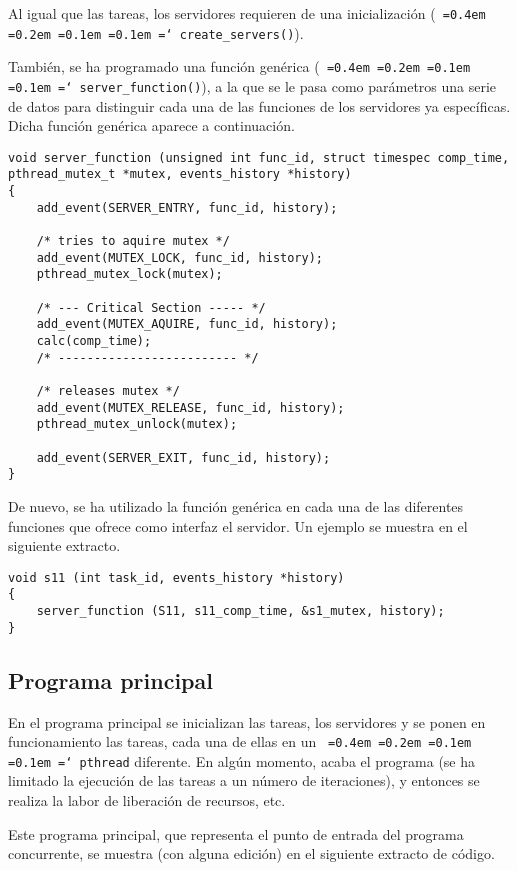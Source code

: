 \documentclass[11pt,spanish]{article}
\newcommand*\justify{%
  \fontdimen2\font=0.4em%
  \fontdimen3\font=0.2em%
  \fontdimen4\font=0.1em%
  \fontdimen7\font=0.1em%
  \hyphenchar\font=`\-%
}
\newcommand{\code}[1]{\texttt{\justify #1}}
\begin{document}
Al igual que las tareas, los servidores requieren de una inicialización (\code{create\_servers()}).

También, se ha programado una función genérica (\code{server\_function()}), a la
que se le pasa como parámetros una serie de datos para distinguir cada una de las
funciones de los servidores ya específicas. Dicha función genérica aparece a 
continuación.

\begin{lstlisting}[style=c]
void server_function (unsigned int func_id, struct timespec comp_time, pthread_mutex_t *mutex, events_history *history) 
{
    add_event(SERVER_ENTRY, func_id, history);
	
	/* tries to aquire mutex */	
    add_event(MUTEX_LOCK, func_id, history);
	pthread_mutex_lock(mutex);

	/* --- Critical Section ----- */
    add_event(MUTEX_AQUIRE, func_id, history);
	calc(comp_time);
	/* ------------------------- */

	/* releases mutex */
    add_event(MUTEX_RELEASE, func_id, history);
	pthread_mutex_unlock(mutex);
	
	add_event(SERVER_EXIT, func_id, history);	
}
\end{lstlisting}

De nuevo, se ha utilizado la función genérica en cada una de las diferentes
funciones que ofrece como interfaz el servidor. Un ejemplo se muestra en el siguiente
extracto.

\begin{lstlisting}[style=c]
void s11 (int task_id, events_history *history) 
{	
	server_function (S11, s11_comp_time, &s1_mutex, history);
}
\end{lstlisting}


\subsection{Programa principal}
En el programa principal se inicializan las tareas, los servidores y se ponen
en funcionamiento las tareas, cada una de ellas en un \code{pthread} diferente.
En algún momento, acaba el programa (se ha limitado la ejecución de las tareas a un 
número de iteraciones), y entonces se realiza la labor de liberación de recursos, etc.

Este programa principal, que representa el punto de entrada del programa concurrente,
se muestra (con alguna edición) en el siguiente extracto de código.
\end{document}
